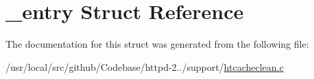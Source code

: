 \hypertarget{struct__entry}{}\section{\+\_\+entry Struct Reference}
\label{struct__entry}


The documentation for this struct was generated from the following file\+:\begin{DoxyCompactItemize}
\item 
/usr/local/src/github/\+Codebase/httpd-\/2../support/\hyperlink{htcacheclean_8c}{htcacheclean.\+c}\end{DoxyCompactItemize}
